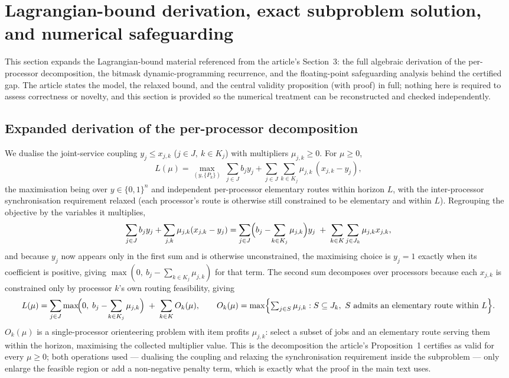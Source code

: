 \documentclass[11pt]{article}
\begin{document}
\section{Lagrangian-bound derivation, exact subproblem solution, and numerical safeguarding}
\label{sec:supp-lagrangian}

This section expands the Lagrangian-bound material referenced from the article's
Section~3: the full algebraic derivation of the per-processor decomposition, the
bitmask dynamic-programming recurrence, and the floating-point safeguarding
analysis behind the certified gap. The article states the model, the relaxed
bound, and the central validity proposition (with proof) in full; nothing here
is required to assess correctness or novelty, and this section is provided so
the numerical treatment can be reconstructed and checked independently.

\subsection{Expanded derivation of the per-processor decomposition}

We dualise the joint-service coupling $y_j\le x_{j,k}$ ($j\in J,\ k\in K_j$) with
multipliers $\mu_{j,k}\ge 0$. For $\mu\ge 0$,
\[
L(\mu) = \max_{(y,\{P_k\})}\ \sum_{j\in J} b_j y_j + \sum_{j\in J}\sum_{k\in K_j}\mu_{j,k}\,(x_{j,k}-y_j),
\]
the maximisation being over $y\in\{0,1\}^n$ and independent per-processor
elementary routes within horizon $L$, with the inter-processor synchronisation
requirement relaxed (each processor's route is otherwise still constrained to be
elementary and within $L$). Regrouping the objective by the variables it
multiplies,
\[
\sum_{j\in J} b_j y_j + \sum_{j,k}\mu_{j,k}(x_{j,k}-y_j)
= \sum_{j\in J}\Bigl(b_j-\!\sum_{k\in K_j}\mu_{j,k}\Bigr)y_j \;+\; \sum_{k\in K}\sum_{j\in J_k}\mu_{j,k}x_{j,k},
\]
and because $y_j$ now appears only in the first sum and is otherwise
unconstrained, the maximising choice is $y_j=1$ exactly when its coefficient is
positive, giving $\max(0,\ b_j-\sum_{k\in K_j}\mu_{j,k})$ for that term. The
second sum decomposes over processors because each $x_{j,k}$ is constrained only
by processor $k$'s own routing feasibility, giving
\[
L(\mu) = \sum_{j\in J}\max\!\Bigl(0,\; b_j-\!\sum_{k\in K_j}\mu_{j,k}\Bigr) \;+\; \sum_{k\in K} O_k(\mu),
\qquad
O_k(\mu) = \max\Bigl\{ \textstyle\sum_{j\in S}\mu_{j,k} : S\subseteq J_k,\ S\text{ admits an elementary route within }L \Bigr\}.
\]
$O_k(\mu)$ is a single-processor orienteering problem with item profits
$\mu_{j,k}$: select a subset of jobs and an elementary route serving them within
the horizon, maximising the collected multiplier value. This is the
decomposition the article's Proposition~1 certifies as valid for every
$\mu\ge 0$; both operations used --- dualising the coupling and relaxing the
synchronisation requirement inside the subproblem --- only enlarge the feasible
region or add a non-negative penalty term, which is exactly what the proof in
the main text uses.
\end{document}
